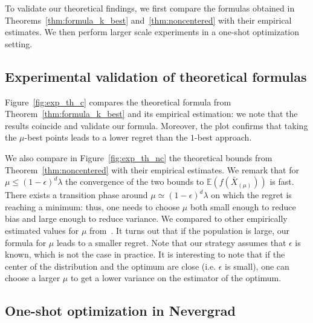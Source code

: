 To validate our theoretical findings, we first compare the formulas obtained in Theorems~\ref{thm:formula_k_best} and~\ref{thm:noncentered} with their empirical estimates. We then perform larger scale experiments in a one-shot optimization setting. 

\subsection{Experimental validation of theoretical formulas}
Figure~\ref{fig:exp_th_c} compares the theoretical formula from Theorem~\ref{thm:formula_k_best} and its empirical estimation: we note that the results coincide and validate our formula. Moreover, the plot confirms that taking the $\mu$-best points leads to a lower regret than the $1$-best approach.



We also compare in Figure~\ref{fig:exp_th_nc} the theoretical bounds from Theorem~\ref{thm:noncentered} with their empirical estimates. We remark that for $\mu\leq (1-\epsilon)^d\lambda$ the convergence of the two bounds to $\mathbb{E}(f(\bar{X}_{(\mu)}))$ is fast. There exists a transition phase around $\mu\simeq (1-\epsilon)^d\lambda$ on which the regret is reaching a minimum: thus, one needs to choose $\mu$ both small enough to reduce bias and large enough to reduce variance. We compared to other empirically estimated values for $\mu$ from~\cite{escompr,HAN,cmsa}. It turns out that if the population is large, our formula for $\mu$ leads to a smaller regret. Note that our strategy assumes that $\epsilon$ is known, which is not the case in practice. It is interesting to note that if the center of the distribution and the optimum are close (i.e. $\epsilon$ is small), one can choose a larger $\mu$ to get  a lower variance on the estimator of the optimum.

\subsection{One-shot optimization in Nevergrad}



